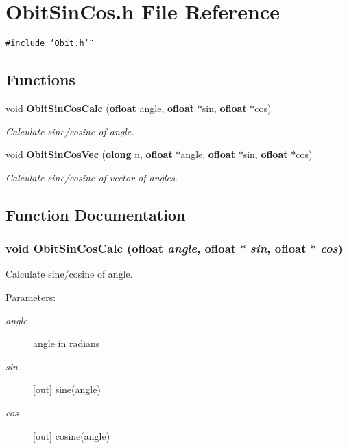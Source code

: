 \section{Obit\-Sin\-Cos.h File Reference}
\label{ObitSinCos_8h}
{\tt \#include \char`\"{}Obit.h\char`\"{}}\par
\subsection*{Functions}
\begin{CompactItemize}
\item 
void {\bf Obit\-Sin\-Cos\-Calc} ({\bf ofloat} angle, {\bf ofloat} $\ast$sin, {\bf ofloat} $\ast$cos)
\begin{CompactList}\small\item\em Calculate sine/cosine of angle. \item\end{CompactList}\item 
void {\bf Obit\-Sin\-Cos\-Vec} ({\bf olong} n, {\bf ofloat} $\ast$angle, {\bf ofloat} $\ast$sin, {\bf ofloat} $\ast$cos)
\begin{CompactList}\small\item\em Calculate sine/cosine of vector of angles. \item\end{CompactList}\end{CompactItemize}


\subsection{Function Documentation}
\subsubsection{\setlength{\rightskip}{0pt plus 5cm}void Obit\-Sin\-Cos\-Calc ({\bf ofloat} {\em angle}, {\bf ofloat} $\ast$ {\em sin}, {\bf ofloat} $\ast$ {\em cos})}\label{ObitSinCos_8h_a0}


Calculate sine/cosine of angle. 

\begin{Desc}
\item[Parameters:]
\begin{description}
\item[{\em angle}]angle in radians \item[{\em sin}][out] sine(angle) \item[{\em cos}][out] cosine(angle) \end{description}
\end{Desc}
